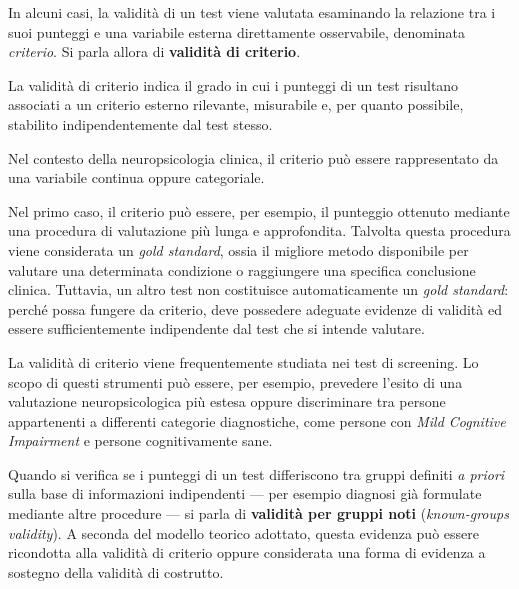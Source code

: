 \documentclass[
  italian,
  letterpaper,
  paper=A4,
  headinclude=on,
  footinclude=on,
  12pt]{scrbook}
\begin{document}
In alcuni casi, la validità di un test viene valutata esaminando la
relazione tra i suoi punteggi e una variabile esterna direttamente
osservabile, denominata \emph{criterio}. Si parla allora di
\textbf{validità di criterio}.

\begin{tcolorbox}[enhanced jigsaw, left=2mm, colbacktitle=quarto-callout-note-color!10!white, bottomrule=.15mm, opacityback=0, coltitle=black, colframe=quarto-callout-note-color-frame, opacitybacktitle=0.6, leftrule=.75mm, colback=white, toprule=.15mm, title=\textcolor{quarto-callout-note-color}{\faInfo}\hspace{0.5em}{Definizione}, titlerule=0mm, arc=.35mm, breakable, rightrule=.15mm, bottomtitle=1mm, toptitle=1mm]

La validità di criterio indica il grado in cui i punteggi di un test
risultano associati a un criterio esterno rilevante, misurabile e, per
quanto possibile, stabilito indipendentemente dal test stesso.

\end{tcolorbox}

Nel contesto della neuropsicologia clinica, il criterio può essere
rappresentato da una variabile continua oppure categoriale.

Nel primo caso, il criterio può essere, per esempio, il punteggio
ottenuto mediante una procedura di valutazione più lunga e approfondita.
Talvolta questa procedura viene considerata un \emph{gold standard},
ossia il migliore metodo disponibile per valutare una determinata
condizione o raggiungere una specifica conclusione clinica. Tuttavia, un
altro test non costituisce automaticamente un \emph{gold standard}:
perché possa fungere da criterio, deve possedere adeguate evidenze di
validità ed essere sufficientemente indipendente dal test che si intende
valutare.

La validità di criterio viene frequentemente studiata nei test di
screening. Lo scopo di questi strumenti può essere, per esempio,
prevedere l'esito di una valutazione neuropsicologica più estesa oppure
discriminare tra persone appartenenti a differenti categorie
diagnostiche, come persone con \emph{Mild Cognitive Impairment} e
persone cognitivamente sane.

Quando si verifica se i punteggi di un test differiscono tra gruppi
definiti \emph{a priori} sulla base di informazioni indipendenti --- per
esempio diagnosi già formulate mediante altre procedure --- si parla di
\textbf{validità per gruppi noti} (\emph{known-groups validity}). A
seconda del modello teorico adottato, questa evidenza può essere
ricondotta alla validità di criterio oppure considerata una forma di
evidenza a sostegno della validità di costrutto.
\end{document}
